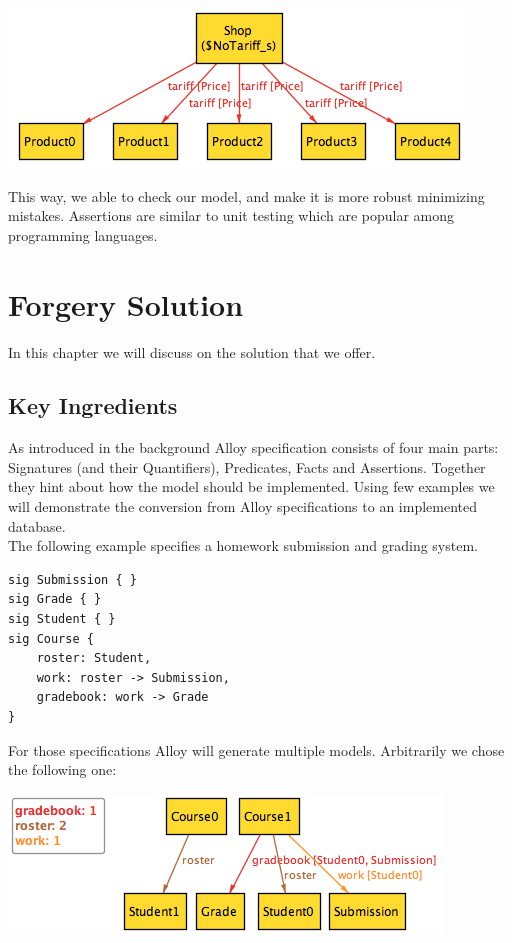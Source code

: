\documentclass[oneside]{book}
\begin{document}
\begin{center}
\includegraphics[scale=0.6]{counterexample1}
\end{center}

This way, we able to check our model, and make it is more robust minimizing mistakes. Assertions are similar to unit testing which are popular among programming languages.

\newpage

\chapter{Forgery Solution}
In this chapter we will discuss on the solution that we offer.

\section{Key Ingredients}

As introduced in the background Alloy specification consists of four main parts: Signatures (and their Quantifiers), Predicates, Facts and Assertions. Together they hint about how the model should be implemented. Using few examples we will demonstrate the conversion from Alloy specifications to an implemented database.\\

The following example specifies a homework submission and grading system. 

\begin{lstlisting}
sig Submission { } 
sig Grade { }
sig Student { }
sig Course {
	roster: Student,
	work: roster -> Submission,
	gradebook: work -> Grade
}
\end{lstlisting}

For those specifications Alloy will generate multiple models. Arbitrarily we chose the following one:\\

\begin{center}
\includegraphics[scale=0.6]{overview1}
\end{center}
\end{document}
